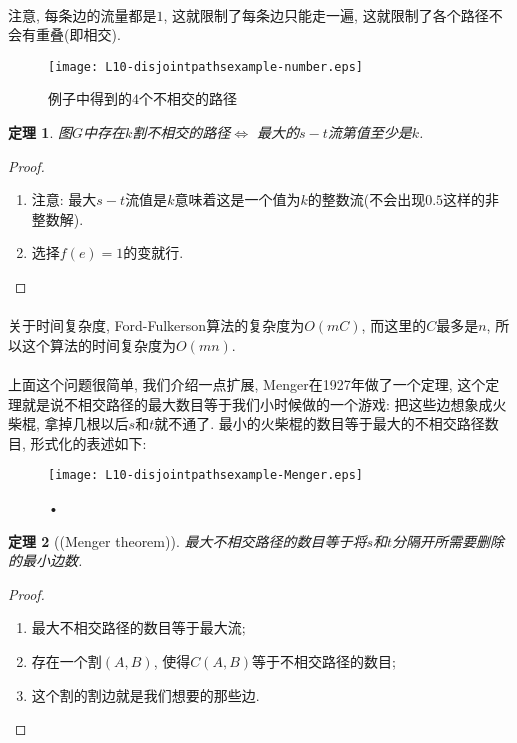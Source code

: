 \documentclass[a4paper]{article}
\newtheorem*{theorem}{定理}
\begin{document}
        \paragraph{}注意, 每条边的流量都是$1$, 这就限制了每条边只能走一遍, 这就限制了各个路径不会有重叠(即相交).
        \begin{figure}[h]
            \centering
            \texttt{[image: L10-disjointpathsexample-number.eps]}
            \caption{例子中得到的$4$个不相交的路径}
            \label{Figure: disjoint_path_example_number}
    \end{figure}
\begin{theorem}
图$G$中存在$k$割不相交的路径$\Leftrightarrow$ 最大的$s-t$流第值至少是$k$.
\end{theorem}
\begin{proof}
 \begin{enumerate}
  \item 注意: 最大$s-t$流值是$k$意味着这是一个值为$k$的整数流(不会出现$0.5$这样的非整数解).
  \item 选择$f(e) = 1$的变就行.
 \end{enumerate}
\end{proof}
            \paragraph{}关于时间复杂度, Ford-Fulkerson算法的复杂度为$O(mC)$, 而这里的$C$最多是$n$, 所以这个算法的时间复杂度为$O( mn)$.
            \paragraph{}上面这个问题很简单, 我们介绍一点扩展, Menger在1927年做了一个定理, 这个定理就是说不相交路径的最大数目等于我们小时候做的一个游戏: 把这些边想象成火柴棍, 拿掉几根以后$s$和$t$就不通了. 最小的火柴棍的数目等于最大的不相交路径数目, 形式化的表述如下:
            \begin{figure}[h]
                \centering
                \texttt{[image: L10-disjointpathsexample-Menger.eps]}
                \caption{•}
            \end{figure}
\begin{theorem}[(Menger theorem)]
最大不相交路径的数目等于将$s$和$t$分隔开所需要删除的最小边数.
\end{theorem}
\begin{proof}
 \begin{enumerate}
  \item 最大不相交路径的数目等于最大流;
  \item 存在一个割$(A,B)$, 使得$C(A,B)$等于不相交路径的数目;
  \item 这个割的割边就是我们想要的那些边.
 \end{enumerate}
\end{proof}
\end{document}
